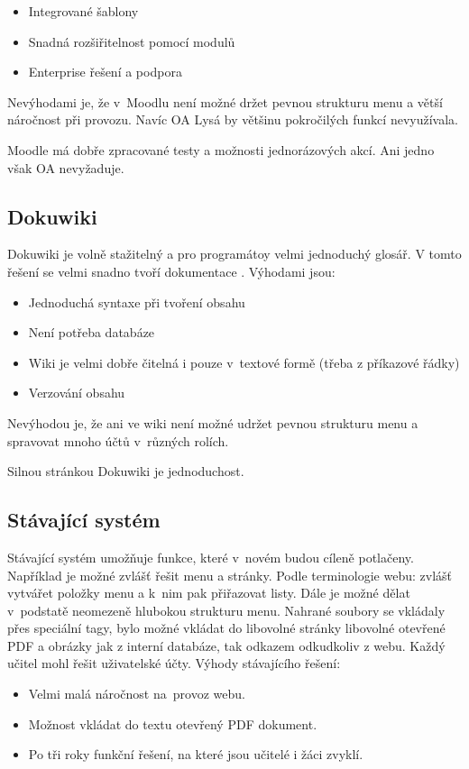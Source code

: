 \documentclass[thesis=B,czech]{FITthesis}[2012/06/26]
\begin{document}
\begin{itemize}
	\item Integrované šablony
	\item Snadná rozšiřitelnost pomocí modulů
	\item Enterprise řešení a podpora
\end{itemize}

Nevýhodami je, že v~Moodlu není možné držet pevnou strukturu menu a větší náročnost při provozu. Navíc OA Lysá by většinu pokročilých funkcí nevyužívala.

Moodle má dobře zpracované testy a možnosti jednorázových akcí. Ani jedno však OA nevyžaduje.

\subsection{Dokuwiki}
Dokuwiki je volně stažitelný a pro programátoy velmi jednoduchý glosář. V tomto řešení se velmi snadno tvoří dokumentace \cite{dokuwiki}. Výhodami jsou:

\begin{itemize}
	\item Jednoduchá syntaxe při tvoření obsahu
	\item Není potřeba databáze
	\item Wiki je velmi dobře čitelná i pouze v~textové formě (třeba z příkazové řádky)
	\item Verzování obsahu
\end{itemize}

Nevýhodou je, že ani ve wiki není možné udržet pevnou strukturu menu a spravovat mnoho účtů v~různých rolích.

Silnou stránkou Dokuwiki je jednoduchost.

\subsection{Stávající systém}
Stávající systém umožňuje funkce, které v~novém budou cíleně potlačeny. Například je možné zvlášť řešit menu a stránky. Podle terminologie webu: zvlášť vytvářet položky menu a k~nim pak přiřazovat listy. Dále je možné dělat v~podstatě neomezeně hlubokou strukturu menu. Nahrané soubory se vkládaly přes speciální tagy, bylo možné vkládat do libovolné stránky libovolné otevřené PDF a obrázky jak z interní databáze, tak odkazem odkudkoliv z webu. Každý učitel mohl řešit uživatelské účty. Výhody stávajícího řešení:

\begin{itemize}
	\item Velmi malá náročnost na~provoz webu.
	\item Možnost vkládat do textu otevřený PDF dokument.
	\item Po tři roky funkční řešení, na které jsou učitelé i žáci zvyklí.
\end{itemize}
\end{document}
